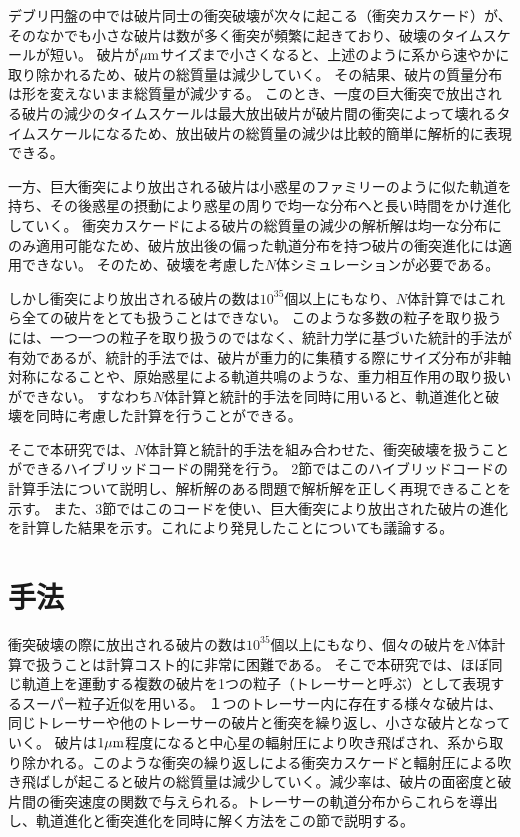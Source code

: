 \documentclass[a4paper,10pt,oneside,twocolumn,notitlepage,final]{jarticle}
\begin{document}
デブリ円盤の中では破片同士の衝突破壊が次々に起こる（衝突カスケード）が、そのなかでも小さな破片は数が多く衝突が頻繁に起きており、破壊のタイムスケールが短い。
破片が$\mu {\rm m}$サイズまで小さくなると、上述のように系から速やかに取り除かれるため、破片の総質量は減少していく。
その結果、破片の質量分布は形を変えないまま総質量が減少する\citep[e.g.,][]{Tanaka1996}。
このとき、一度の巨大衝突で放出される破片の減少のタイムスケールは最大放出破片が破片間の衝突によって壊れるタイムスケールになるため、放出破片の総質量の減少は比較的簡単に解析的に表現できる\citep{Kobayashi2010}。

一方、巨大衝突により放出される破片は小惑星のファミリーのように似た軌道を持ち、その後惑星の摂動により惑星の周りで均一な分布へと長い時間をかけ進化していく\citep{Jackson2012}。
衝突カスケードによる破片の総質量の減少の解析解は均一な分布にのみ適用可能なため、破片放出後の偏った軌道分布を持つ破片の衝突進化には適用できない。
そのため、破壊を考慮した$N$体シミュレーションが必要である。

しかし衝突により放出される破片の数は$10^{35}$個以上にもなり、$N$体計算ではこれら全ての破片をとても扱うことはできない。
このような多数の粒子を取り扱うには、一つ一つの粒子を取り扱うのではなく、統計力学に基づいた統計的手法が有効であるが、統計的手法では、破片が重力的に集積する際にサイズ分布が非軸対称になることや、原始惑星による軌道共鳴のような、重力相互作用の取り扱いができない。
すなわち$N$体計算と統計的手法を同時に用いると、軌道進化と破壊を同時に考慮した計算を行うことができる。

そこで本研究では、$N$体計算と統計的手法を組み合わせた、衝突破壊を扱うことができるハイブリッドコードの開発を行う。
2節ではこのハイブリッドコードの計算手法について説明し、解析解のある問題で解析解を正しく再現できることを示す。
また、3節ではこのコードを使い、巨大衝突により放出された破片の進化を計算した結果を示す。これにより発見したことについても議論する。

\section{手法}
衝突破壊の際に放出される破片の数は$10^{35}$個以上にもなり、個々の破片を$N$体計算で扱うことは計算コスト的に非常に困難である。
そこで本研究では、ほぼ同じ軌道上を運動する複数の破片を1つの粒子（トレーサーと呼ぶ）として表現するスーパー粒子近似を用いる。
１つのトレーサー内に存在する様々な破片は、同じトレーサーや他のトレーサーの破片と衝突を繰り返し、小さな破片となっていく。
破片は$1\mu {\rm m}$程度になると中心星の輻射圧により吹き飛ばされ、系から取り除かれる。このような衝突の繰り返しによる衝突カスケードと輻射圧による吹き飛ばしが起こると破片の総質量は減少していく。減少率は、破片の面密度と破片間の衝突速度の関数で与えられる\citep{Kobayashi2010}。トレーサーの軌道分布からこれらを導出し、軌道進化と衝突進化を同時に解く方法をこの節で説明する。
\end{document}
